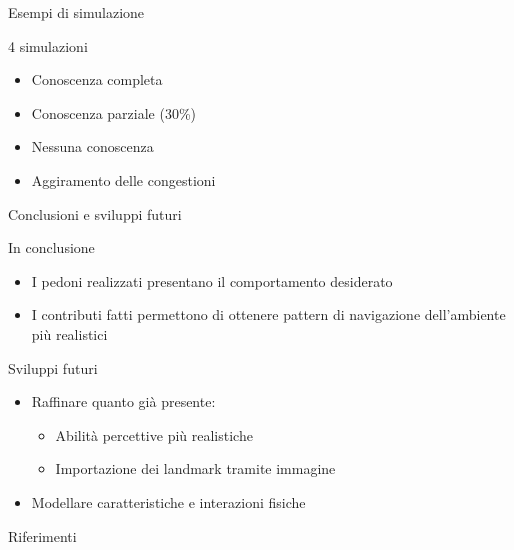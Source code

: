 \documentclass{beamer}
\begin{document}
\begin{frame}{Esempi di simulazione}
\begin{block}{4 simulazioni}
\begin{itemize}
    \item Conoscenza completa
    \item Conoscenza parziale (30\%)
    \item Nessuna conoscenza
    \item Aggiramento delle congestioni
\end{itemize}
\end{block}
\end{frame}

\begin{frame}{Conclusioni e sviluppi futuri}
\begin{block}{In conclusione}
\begin{itemize}
    \item I pedoni realizzati presentano il comportamento desiderato
    \item I contributi fatti permettono di ottenere pattern di navigazione dell'ambiente più realistici
\end{itemize}{}
\end{block}
\begin{block}{Sviluppi futuri}
\begin{itemize}
    \item Raffinare quanto già presente:
    \begin{itemize}
        \item Abilità percettive più realistiche
        \item Importazione dei landmark tramite immagine
    \end{itemize}{}
    \item Modellare caratteristiche e interazioni fisiche
\end{itemize}{}
\end{block}{}
\end{frame}{}

\begin{frame}{Riferimenti}
    \nocite{*}
    
    
\end{frame}
\end{document}
